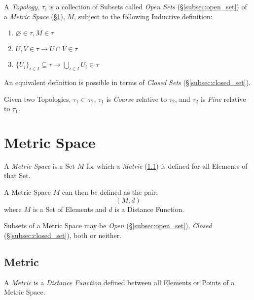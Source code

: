 \documentclass{article}
\begin{document}
A \emph{Topology}, $\tau$, is a collection of Subsets called
\emph{Open Sets} (\S\ref{subsec:open_set}) of a \emph{Metric Space}
(\S\ref{sec:metric_space}), $M$, subject to the following Inductive
definition:
\begin{enumerate}
\item $\varnothing \in \tau, M \in \tau$
\item $U,V \in \tau \rightarrow U \cap V \in \tau$
\item $\{U_i\}_{i \in I} \subseteq \tau \rightarrow \bigcup_{i \in I}
  U_i \in \tau$
\end{enumerate}

An equivalent definition is possible in terms of \emph{Closed Sets}
(\S\ref{subsec:closed_set}).

Given two Topologies, $\tau_1 \subset \tau_2$, $\tau_1$ is
\emph{Coarse} relative to $\tau_2$, and $\tau_2$ is \emph{Fine}
relative to $\tau_1$.



\section{Metric Space}\label{sec:metric_space}

A \emph{Metric Space} is a Set $M$ for which a \emph{Metric}
(\ref{subsec:metric}) is defined for all Elements of that Set.

A Metric Space $M$ can then be defined as the pair:
\[
    (M,d)
\]
where $M$ is a Set of Elements and $d$ is a Distance Function.

Subsets of a Metric Space may be \emph{Open}
(\S\ref{subsec:open_set}), \emph{Closed} (\S\ref{subsec:closed_set}),
both or neither.



\subsection{Metric}\label{subsec:metric}

A \emph{Metric} is a \emph{Distance Function} defined between all
Elements or Points of a Metric Space.
\end{document}
